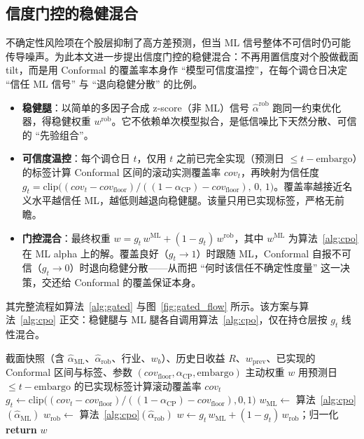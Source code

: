 \subsection{信度门控的稳健混合}
\label{subsec:gated}
不确定性风险项在个股层抑制了高方差预测，但当 ML 信号整体不可信时仍可能传导噪声。为此本文进一步提出信度门控的稳健混合：不再用置信度对个股做截面 tilt，而是用 Conformal 的覆盖率本身作 ``模型可信度温控''，在每个调仓日决定 ``信任 ML 信号'' 与 ``退向稳健分散'' 的比例。
\begin{itemize}
    \item \textbf{稳健腿}：以简单的多因子合成 z-score（非 ML）信号 $\hat\alpha^{\text{rob}}$ 跑同一约束优化器，得稳健权重 $w^{\text{rob}}$。它不依赖单次模型拟合，是低信噪比下天然分散、可信的 ``先验组合''。
    \item \textbf{可信度温控}：每个调仓日 $t$，仅用 $t$ 之前已完全实现（预测日 $\le t-\text{embargo}$）的标签计算 Conformal 区间的滚动实测覆盖率 $cov_t$，再映射为信任度 $g_t=\mathrm{clip}\big((cov_t-cov_{\text{floor}})/((1-\alpha_{\text{CP}})-cov_{\text{floor}}),\,0,\,1\big)$。覆盖率越接近名义水平越信任 ML，越低则越退向稳健腿。该量只用已实现标签，严格无前瞻。
    \item \textbf{门控混合}：最终权重 $w=g_t\,w^{\text{ML}}+(1-g_t)\,w^{\text{rob}}$，其中 $w^{\text{ML}}$ 为算法~\ref{alg:cpo} 在 ML alpha 上的解。覆盖良好（$g_t\to1$）时跟随 ML，Conformal 自报不可信（$g_t\to0$）时退向稳健分散——从而把 ``何时该信任不确定性度量'' 这一决策，交还给 Conformal 的覆盖保证本身。
\end{itemize}
其完整流程如算法~\ref{alg:gated} 与图~\ref{fig:gated_flow} 所示。该方案与算法~\ref{alg:cpo} 正交：稳健腿与 ML 腿各自调用算法~\ref{alg:cpo}，仅在持仓层按 $g_t$ 线性混合。

\begin{algorithm}[H]
\caption{信度门控的稳健混合（单期调仓）}
\label{alg:gated}
\begin{algorithmic}[1]
\Require 截面快照（含 $\hat\alpha_{\text{ML}}$、$\hat\alpha_{\text{rob}}$、行业、$w_b$）、历史日收益 $R$、$w_{\text{prev}}$、已实现的 Conformal 区间与标签、参数 $(cov_{\text{floor}},\alpha_{\text{CP}},\text{embargo})$
\Ensure 主动权重 $w$
\State 用预测日 $\le t-\text{embargo}$ 的已实现标签计算滚动覆盖率 $cov_t$ 
\State $g_t \gets \mathrm{clip}\big((cov_t-cov_{\text{floor}})/((1-\alpha_{\text{CP}})-cov_{\text{floor}}),0,1\big)$ 
\State $w_{\text{ML}} \gets$ 算法~\ref{alg:cpo}$(\hat\alpha_{\text{ML}})$ 
\State $w_{\text{rob}} \gets$ 算法~\ref{alg:cpo}$(\hat\alpha_{\text{rob}})$ 
\State $w \gets g_t\,w_{\text{ML}} + (1-g_t)\,w_{\text{rob}}$；归一化
\State \textbf{return} $w$
\end{algorithmic}
\end{algorithm}

